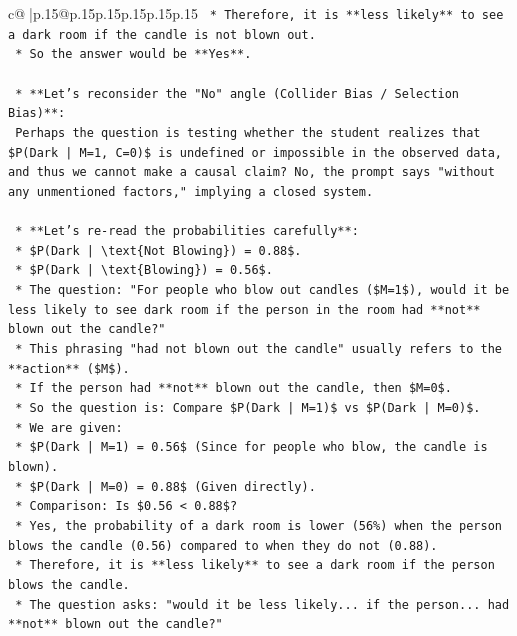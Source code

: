 \documentclass{article}
\begin{document}
{\begin{supertabular}{c@{$\;$}|p{.15\linewidth}@{}p{.15\linewidth}p{.15\linewidth}p{.15\linewidth}p{.15\linewidth}p{.15\linewidth}}
{{{\texttt{            *   Therefore, it is **less likely** to see a dark room if the candle is not blown out.} \\
\texttt{            *   So the answer would be **Yes**.} \\
\\ 
\texttt{    *   **Let's reconsider the "No" angle (Collider Bias / Selection Bias)**:} \\
\texttt{        Perhaps the question is testing whether the student realizes that \$P(Dark | M=1, C=0)\$ is undefined or impossible in the observed data, and thus we cannot make a causal claim? No, the prompt says "without any unmentioned factors," implying a closed system.} \\
\\ 
\texttt{    *   **Let's re{-}read the probabilities carefully**:} \\
\texttt{        *   \$P(Dark | \textbackslash{}text\{Not Blowing\}) = 0.88\$.} \\
\texttt{        *   \$P(Dark | \textbackslash{}text\{Blowing\}) = 0.56\$.} \\
\texttt{        *   The question: "For people who blow out candles (\$M=1\$), would it be less likely to see dark room if the person in the room had **not** blown out the candle?"} \\
\texttt{        *   This phrasing "had not blown out the candle" usually refers to the **action** (\$M\$).} \\
\texttt{        *   If the person had **not** blown out the candle, then \$M=0\$.} \\
\texttt{        *   So the question is: Compare \$P(Dark | M=1)\$ vs \$P(Dark | M=0)\$.} \\
\texttt{        *   We are given:} \\
\texttt{            *   \$P(Dark | M=1) = 0.56\$ (Since for people who blow, the candle is blown).} \\
\texttt{            *   \$P(Dark | M=0) = 0.88\$ (Given directly).} \\
\texttt{        *   Comparison: Is \$0.56 < 0.88\$?} \\
\texttt{        *   Yes, the probability of a dark room is lower (56\%) when the person blows the candle (0.56) compared to when they do not (0.88).} \\
\texttt{        *   Therefore, it is **less likely** to see a dark room if the person blows the candle.} \\
\texttt{        *   The question asks: "would it be less likely... if the person... had **not** blown out the candle?"} \\
}}}
\end{supertabular}}
\end{document}

